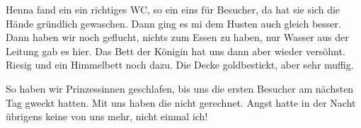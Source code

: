 Henna fand ein ein richtiges WC, so ein eins für Besucher, da hat sie sich die Hände gründlich gewaschen. Dann ging es mi dem Husten auch gleich besser. Dann haben wir noch geflucht, nichts zum Essen zu haben, nur Wasser aus der Leitung gab es hier. Das Bett der Königin hat uns dann aber wieder versöhnt. Riesig und ein Himmelbett noch dazu. Die Decke goldbestickt, aber sehr muffig.

So haben wir Prinzessinnen geschlafen, bis uns die ersten Besucher am nächsten Tag gweckt hatten. Mit uns haben die nicht gerechnet. Angst hatte in der Nacht übrigens keine von uns mehr, nicht einmal ich!




